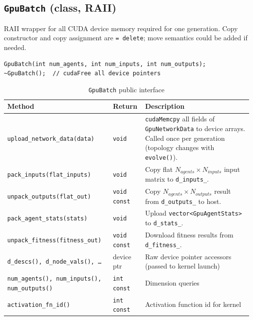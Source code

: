 \subsection{\texttt{GpuBatch} (class, RAII)}

RAII wrapper for all CUDA device memory required for one generation.  Copy constructor
and copy assignment are \texttt{= delete}; move semantics could be added if needed.

\begin{lstlisting}
GpuBatch(int num_agents, int num_inputs, int num_outputs);
~GpuBatch();  // cudaFree all device pointers
\end{lstlisting}

\begin{table}[H]
\centering\small
\caption{\texttt{GpuBatch} public interface}
\begin{tabularx}{\textwidth}{@{}llX@{}}
\toprule
\textbf{Method} & \textbf{Return} & \textbf{Description} \\
\midrule
\texttt{upload\_network\_data(data)} & \texttt{void} &
  \texttt{cudaMemcpy} all fields of \texttt{GpuNetworkData} to device arrays.
  Called once per generation (topology changes with \texttt{evolve()}). \\
\texttt{pack\_inputs(flat\_inputs)} & \texttt{void} &
  Copy flat $N_{\mathit{agents}} \times N_{\mathit{inputs}}$ input matrix to
  \texttt{d\_inputs\_}. \\
\texttt{unpack\_outputs(flat\_out)} & \texttt{void const} &
  Copy $N_{\mathit{agents}} \times N_{\mathit{outputs}}$ result from
  \texttt{d\_outputs\_} to host. \\
\texttt{pack\_agent\_stats(stats)} & \texttt{void} &
  Upload \texttt{vector<GpuAgentStats>} to \texttt{d\_stats\_}. \\
\texttt{unpack\_fitness(fitness\_out)} & \texttt{void const} &
  Download fitness results from \texttt{d\_fitness\_}. \\
\texttt{d\_descs(), d\_node\_vals(), \ldots} & device ptr & Raw device pointer accessors (passed to kernel launch) \\
\texttt{num\_agents(), num\_inputs(), num\_outputs()} & \texttt{int const} & Dimension queries \\
\texttt{activation\_fn\_id()} & \texttt{int const} & Activation function id for kernel \\
\bottomrule
\end{tabularx}
\end{table}


